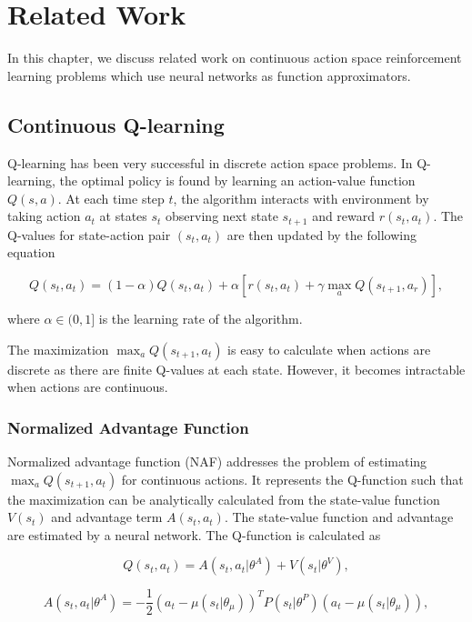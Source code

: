 \chapter{Related Work}\label{chapter:related_work}
In this chapter, we discuss related work on continuous action space reinforcement learning problems which use neural networks as function approximators.

\section{Continuous Q-learning}
Q-learning has been very successful in discrete action space problems. In Q-learning, the optimal policy is found by learning an action-value function $Q(s,a)$. At each time step $t$, the algorithm interacts with environment by taking action $a_t$ at states $s_t$ observing next state $s_{t+1}$ and reward $r(s_t, a_t)$. The Q-values for state-action pair $(s_t, a_t)$ are then updated by the following equation

\begin{equation}\label{eq:qlearning}
Q(s_t,a_t) = (1-\alpha) Q(s_t,a_t) + \alpha [r(s_t,a_t) + \gamma \max_a Q(s_{t+1}, a_r)],
\end{equation}

where $\alpha \in (0, 1]$ is the learning rate of the algorithm.


The maximization $\max_a Q(s_{t+1}, a_t)$ is easy to calculate when actions are discrete as there are finite Q-values at each state. However, it becomes intractable when actions are continuous. 

\subsection{Normalized Advantage Function}
Normalized advantage function (NAF) \cite{gu2016} addresses the problem of estimating $\max_a Q(s_{t+1}, a_t)$ for continuous actions. It represents the Q-function such that the maximization can be analytically calculated from the state-value function $V(s_t)$ and advantage term $A(s_t, a_t)$. The state-value function and advantage are estimated by a neural network. The Q-function is calculated as 

\begin{equation}
Q(s_t, a_t) = A(s_t, a_t|\theta^A) + V(s_t|\theta^V),
\end{equation}

\begin{equation}\label{eq:naf}
A(s_t, a_t|\theta^A) = -\dfrac{1}{2} (a_t - \mu(s_t|\theta_\mu))^T  P(s_t|\theta^P) (a_t - \mu(s_t|\theta_\mu)),
\end{equation}

